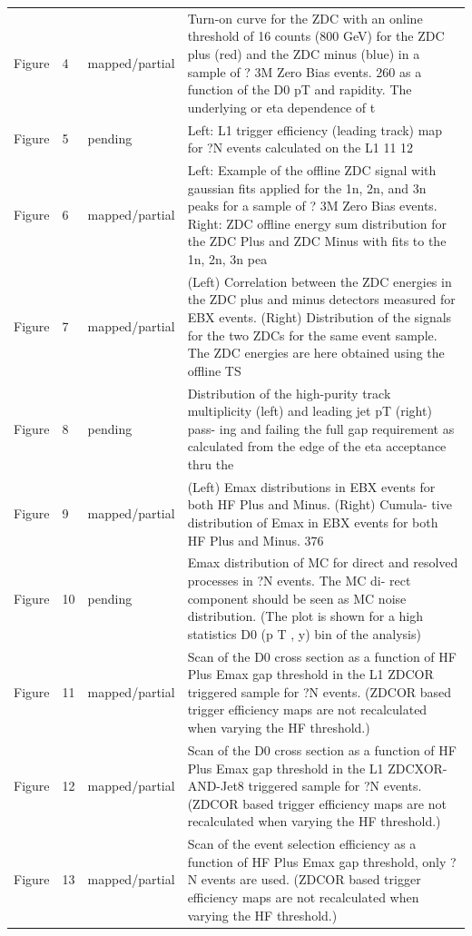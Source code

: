 \documentclass[11pt]{article}
\begin{document}
\begin{longtable}{lll p{}}
Figure & 4 & mapped/partial & Turn-on curve for the ZDC with an online threshold of 16 counts (800 GeV) for the ZDC plus (red) and the ZDC minus (blue) in a sample of ? 3M Zero Bias events. 260 as a function of the D0 pT and rapidity. The underlying or eta dependence of t \\
Figure & 5 & pending & Left: L1 trigger efficiency (leading track) map for ?N events calculated on the L1 11 12 \\
Figure & 6 & mapped/partial & Left: Example of the offline ZDC signal with gaussian fits applied for the 1n, 2n, and 3n peaks for a sample of ? 3M Zero Bias events. Right: ZDC offline energy sum distribution for the ZDC Plus and ZDC Minus with fits to the 1n, 2n, 3n pea \\
Figure & 7 & mapped/partial & (Left) Correlation between the ZDC energies in the ZDC plus and minus detectors measured for EBX events. (Right) Distribution of the signals for the two ZDCs for the same event sample. The ZDC energies are here obtained using the offline TS \\
Figure & 8 & pending & Distribution of the high-purity track multiplicity (left) and leading jet pT (right) pass- ing and failing the full gap requirement as calculated from the edge of the eta acceptance thru the \\
Figure & 9 & mapped/partial & (Left) Emax distributions in EBX events for both HF Plus and Minus. (Right) Cumula- tive distribution of Emax in EBX events for both HF Plus and Minus. 376 \\
Figure & 10 & pending & Emax distribution of MC for direct and resolved processes in ?N events. The MC di- rect component should be seen as MC noise distribution. (The plot is shown for a high statistics D0 (p T , y) bin of the analysis) \\
Figure & 11 & mapped/partial & Scan of the D0 cross section as a function of HF Plus Emax gap threshold in the L1 ZDCOR triggered sample for ?N events. (ZDCOR based trigger efficiency maps are not recalculated when varying the HF threshold.) \\
Figure & 12 & mapped/partial & Scan of the D0 cross section as a function of HF Plus Emax gap threshold in the L1 ZDCXOR-AND-Jet8 triggered sample for ?N events. (ZDCOR based trigger efficiency maps are not recalculated when varying the HF threshold.) \\
Figure & 13 & mapped/partial & Scan of the event selection efficiency as a function of HF Plus Emax gap threshold, only ?N events are used. (ZDCOR based trigger efficiency maps are not recalculated when varying the HF threshold.) \\

\end{longtable}
\end{document}

